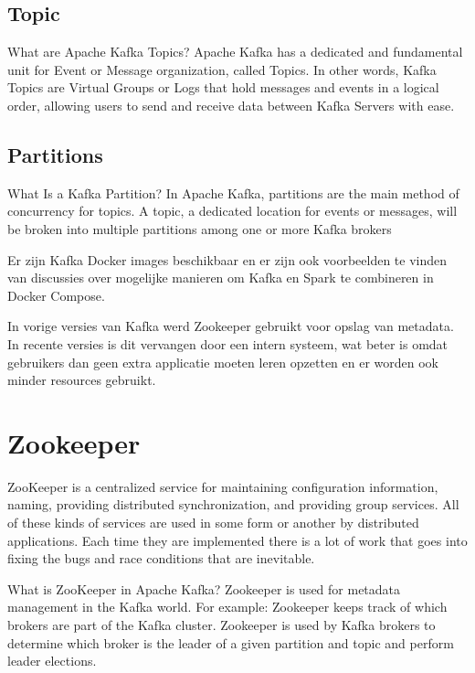 \subsection{Topic}
What are Apache Kafka Topics? Apache Kafka has a dedicated and fundamental unit for Event or Message organization, called Topics. In other words, Kafka Topics are Virtual Groups or Logs that hold messages and events in a logical order, allowing users to send and receive data between Kafka Servers with ease.\autocite{Ishwarya2022}

\subsection{Partitions}
What Is a Kafka Partition? In Apache Kafka, partitions are the main method of concurrency for topics. A topic, a dedicated location for events or messages, will be broken into multiple partitions among one or more Kafka brokers\autocite{Carder2022}

Er zijn Kafka Docker images beschikbaar en er zijn ook voorbeelden te vinden van discussies over mogelijke manieren om Kafka en Spark te combineren in Docker Compose.

In vorige versies van Kafka werd Zookeeper gebruikt voor opslag van metadata. In recente versies is dit vervangen door een intern systeem, wat beter is omdat gebruikers dan geen extra applicatie moeten leren opzetten en er worden ook minder resources gebruikt.

\section{Zookeeper}
\begin{Zookeeper}
    ZooKeeper is a centralized service for maintaining configuration information, naming, providing distributed synchronization, and providing group services. All of these kinds of services are used in some form or another by distributed applications. Each time they are implemented there is a lot of work that goes into fixing the bugs and race conditions that are inevitable.\autocite{ASF2023}
    
    What is ZooKeeper in Apache Kafka?
    Zookeeper is used for metadata management in the Kafka world. For example: Zookeeper keeps track of which brokers are part of the Kafka cluster. Zookeeper is used by Kafka brokers to determine which broker is the leader of a given partition and topic and perform leader elections. \autocite{Conduktor2023}
\end{Zookeeper}

